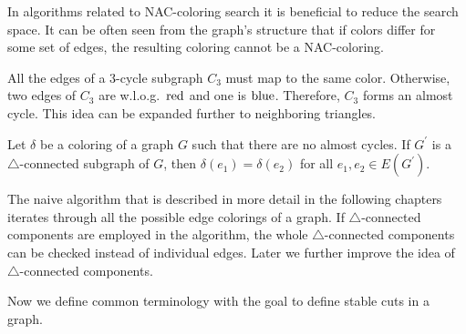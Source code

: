 In algorithms related to NAC-coloring search it is beneficial
to reduce the search space.
It can be often seen from the graph's structure
that if colors differ for some set of edges,
the resulting coloring cannot be a NAC-coloring.

All the edges of a 3-cycle subgraph \( C_3 \) must map to the same color.
Otherwise, two edges of \( C_3 \) are w.l.o.g.\ \( \text{red} \) and one is \( \text{blue} \).
Therefore, \( C_3 \) forms an almost cycle.
This idea can be expanded further to neighboring triangles.
%
%
\begin{lemma}
	Let \( \delta \) be a coloring of a graph \( G \) such that there are
	no almost cycles. If \( G^\prime \) is
	a \( \triangle \)-connected subgraph of \( G \),
	then \( \delta(e_1) = \delta(e_2) \) for all \( e_1, e_2 \in E(G^\prime) \).
\end{lemma}
%
The naive algorithm that is described in more detail in the following chapters
iterates through all the possible edge colorings of a graph.
If \( \triangle \)-connected components are employed in the algorithm,
the whole \( \triangle \)-connected components can be checked instead of individual edges.
Later we further improve the idea of \( \triangle \)-connected components.

Now we define common terminology with the goal to define stable cuts in a graph.

